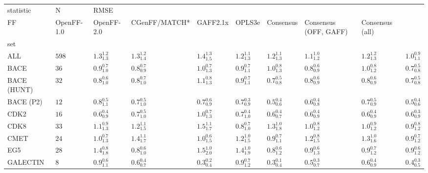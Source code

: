 \begin{tabular}{llllllllll}
\toprule
statistic &      N & \multicolumn{8}{l}{RMSE} \\
FF &         OpenFF-1.0 &         OpenFF-2.0 &      CGenFF/MATCH* &           GAFF2.1x &             OPLS3e &          Consensus & Consensus (OFF, GAFF) &    Consensus (all) \\
set         &        &                    &                    &                    &                    &                    &                    &                       &                    \\
\midrule
ALL         &  $598$ &  $1.3^{1.2}_{1.3}$ &  $1.3^{1.2}_{1.4}$ &  $1.4^{1.3}_{1.5}$ &  $1.2^{1.1}_{1.3}$ &  $1.2^{1.1}_{1.3}$ &  $1.1^{1.0}_{1.2}$ &     $1.2^{1.2}_{1.3}$ &  $1.0^{0.9}_{1.1}$ \\
BACE        &   $36$ &  $0.9^{0.7}_{1.0}$ &  $0.8^{0.7}_{0.9}$ &  $1.0^{0.7}_{1.3}$ &  $0.9^{0.7}_{1.1}$ &  $1.0^{0.8}_{1.3}$ &  $0.8^{0.6}_{0.9}$ &     $1.0^{0.8}_{1.2}$ &  $0.7^{0.5}_{0.8}$ \\
BACE (HUNT) &   $32$ &  $0.8^{0.6}_{1.0}$ &  $0.8^{0.7}_{1.0}$ &  $1.1^{0.8}_{1.3}$ &  $0.9^{0.7}_{1.1}$ &  $0.7^{0.5}_{0.8}$ &  $0.8^{0.6}_{0.9}$ &     $0.8^{0.6}_{0.9}$ &  $0.7^{0.5}_{0.8}$ \\
BACE (P2)   &   $12$ &  $0.8^{0.5}_{1.1}$ &  $0.7^{0.5}_{1.0}$ &  $0.7^{0.6}_{0.9}$ &  $0.7^{0.3}_{0.9}$ &  $0.5^{0.4}_{0.6}$ &  $0.6^{0.4}_{0.8}$ &     $0.7^{0.5}_{0.9}$ &  $0.5^{0.4}_{0.6}$ \\
CDK2        &   $16$ &  $0.6^{0.4}_{0.9}$ &  $0.7^{0.5}_{1.0}$ &  $1.0^{0.7}_{1.3}$ &  $0.7^{0.4}_{1.0}$ &  $0.6^{0.4}_{0.7}$ &  $0.6^{0.4}_{0.9}$ &     $0.6^{0.4}_{0.9}$ &  $0.6^{0.3}_{0.9}$ \\
CDK8        &   $33$ &  $1.1^{0.9}_{1.3}$ &  $1.2^{1.1}_{1.5}$ &  $1.5^{1.1}_{1.7}$ &  $0.8^{0.7}_{1.0}$ &  $1.3^{1.0}_{1.8}$ &  $1.0^{0.8}_{1.2}$ &     $1.0^{0.9}_{1.2}$ &  $0.9^{0.8}_{1.2}$ \\
CMET        &   $24$ &  $1.0^{0.7}_{1.3}$ &  $1.4^{1.1}_{1.7}$ &  $1.0^{0.6}_{1.5}$ &  $1.2^{1.0}_{1.5}$ &  $0.9^{0.7}_{1.1}$ &  $1.2^{0.8}_{1.5}$ &     $1.3^{1.0}_{1.6}$ &  $0.9^{0.7}_{1.2}$ \\
EG5         &   $28$ &  $1.4^{0.8}_{1.8}$ &  $0.8^{0.6}_{1.0}$ &  $1.5^{1.0}_{2.0}$ &  $1.4^{1.0}_{1.9}$ &  $0.8^{0.6}_{1.2}$ &  $0.9^{0.6}_{1.3}$ &     $0.9^{0.7}_{1.2}$ &  $0.9^{0.6}_{1.2}$ \\
GALECTIN    &    $8$ &  $0.9^{0.6}_{1.1}$ &  $0.6^{0.4}_{0.7}$ &  $0.3^{0.2}_{0.4}$ &  $0.9^{0.7}_{1.2}$ &  $0.3^{0.1}_{0.4}$ &  $0.5^{0.3}_{0.7}$ &     $0.6^{0.4}_{0.9}$ &  $0.4^{0.3}_{0.5}$ \\

\end{tabular}
